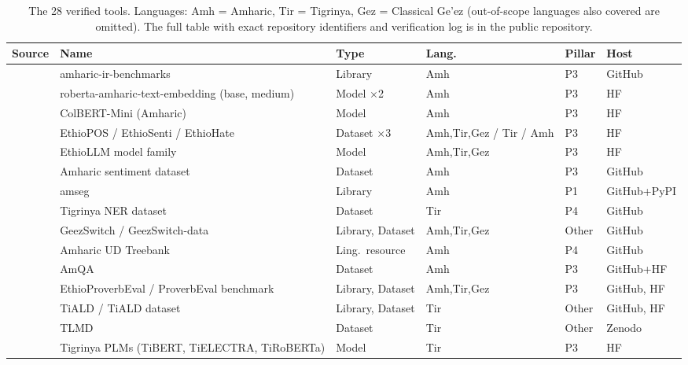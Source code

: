 \documentclass[runningheads]{llncs}
\begin{document}
\begin{table}[!t]
\centering
\caption{The 28 verified tools. Languages: Amh = Amharic, Tir = Tigrinya, Gez = Classical Ge'ez (out-of-scope languages also covered are omitted). The full table with exact repository identifiers and verification log is in the public repository.}\label{tab:inventory}
\scriptsize
\setlength{\tabcolsep}{3pt}
\begin{tabularx}{\textwidth}{@{}l>{\raggedright\arraybackslash}Xllll@{}}
\toprule
\textbf{Source} & \textbf{Name} & \textbf{Type} & \textbf{Lang.} & \textbf{Pillar} & \textbf{Host}\\
\midrule
\cite{mekonnen_optimized_2025} & amharic-ir-benchmarks & Library & Amh & P3 & GitHub\\
\cite{mekonnen_optimized_2025} & roberta-amharic-text-embedding (base, medium) & Model $\times$2 & Amh & P3 & HF\\
\cite{mekonnen_optimized_2025} & ColBERT-Mini (Amharic) & Model & Amh & P3 & HF\\
\cite{tonja_ethiollm_2024} & EthioPOS / EthioSenti / EthioHate & Dataset $\times$3 & Amh,Tir,Gez / Tir / Amh & P3 & HF\\
\cite{tonja_ethiollm_2024} & EthioLLM model family & Model & Amh,Tir,Gez & P3 & HF\\
\cite{yimam_exploring_2020} & Amharic sentiment dataset & Dataset & Amh & P3 & GitHub\\
\cite{yimam_introducing_2021} & amseg & Library & Amh & P1 & GitHub+PyPI\\
\cite{yohannes_named-entity_2022} & Tigrinya NER dataset & Dataset & Tir & P4 & GitHub\\
\cite{gaim_geezswitch_2022} & GeezSwitch / GeezSwitch-data & Library, Dataset & Amh,Tir,Gez & Other & GitHub\\
\cite{seyoum_universal_2018} & Amharic UD Treebank & Ling.\ resource & Amh & P4 & GitHub\\
\cite{abedissa_amqa_2023} & AmQA & Dataset & Amh & P3 & GitHub+HF\\
\cite{azime_proverbeval_2024} & EthioProverbEval / ProverbEval benchmark & Library, Dataset & Amh,Tir,Gez & P3 & GitHub, HF\\
\cite{gaim_multitask_2025} & TiALD / TiALD dataset & Library, Dataset & Tir & Other & GitHub, HF\\
\cite{gaim_tlmd_2021} & TLMD & Dataset & Tir & Other & Zenodo\\
\cite{gaim_monolingual_2021} & Tigrinya PLMs (TiBERT, TiELECTRA, TiRoBERTa) & Model & Tir & P3 & HF\\

\end{tabularx}
\end{table}
\end{document}
